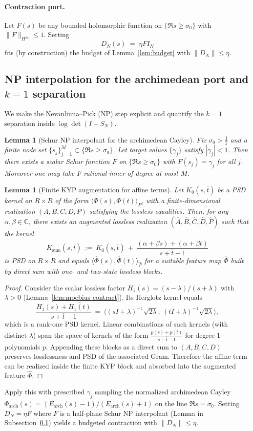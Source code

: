\documentclass[11pt]{article}
\newtheorem{lemma}[theorem]{Lemma}
\theoremstyle{definition}
\theoremstyle{remark}
\newcommand{\C}{\mathbb{C}}
\begin{document}
\paragraph{Contraction port.}
Let $F(s)$ be any bounded holomorphic function on $\{\Re s\ge \sigma_0\}$ with $\|F\|_{H^\infty}\le 1$. Setting
\[
 D_N(s)\;=\;\eta F I_N
\]
fits (by construction) the budget of Lemma~\ref{lem:budget} with $\|D_N\|\le \eta$.
\subsection{NP interpolation for the archimedean port and $k=1$ separation}\label{subsec:NP-arch}
We make the Nevanlinna--Pick (NP) step explicit and quantify the $k=1$ separation inside $\log\det(I-S_N)$.
\begin{lemma}[Schur NP interpolant for the archimedean Cayley]
Fix $\sigma_0>\tfrac12$ and a finite node set $\{s_j\}_{j=1}^{M}\subset\{\Re s\ge \sigma_0\}$. Let target values $\{\gamma_j\}$ satisfy $|\gamma_j|<1$. Then there exists a scalar Schur function $F$ on $\{\Re s\ge \sigma_0\}$ with $F(s_j)=\gamma_j$ for all $j$. Moreover one may take $F$ rational inner of degree at most $M$.
\end{lemma}
\begin{lemma}[Finite KYP augmentation for affine terms]\label{lem:affine-gram}
Let \(K_0(s,\overline t)\) be a PSD kernel on \(R\times R\) of the form \(\langle \Phi(s),\Phi(t)\rangle_{P}\), with a finite-dimensional realization \((A,B,C,D,P)\) satisfying the lossless equalities. Then, for any \(\alpha,\beta\in\C\), there exists an augmented lossless realization \((\widehat A,\widehat B,\widehat C,\widehat D,\widehat P)\) such that the kernel
\[
 K_\mathrm{sum}(s,\overline t)\ :=\ K_0(s,\overline t)\ +\ \frac{(\alpha+\beta s)+\overline{(\alpha+\beta t)}}{s+\overline t -1}
\]
is PSD on \(R\times R\) and equals \(\langle \widehat\Phi(s),\widehat\Phi(t)\rangle_{\widehat P}\) for a suitable feature map \(\widehat\Phi\) built by direct sum with one- and two-state lossless blocks.
\end{lemma}
\begin{proof}
Consider the scalar lossless factor \(H_1(s)=(s-\lambda)/(s+\lambda)\) with \(\lambda>0\) (Lemma~\ref{lem:moebius-contract}). Its Herglotz kernel equals
\[\frac{H_1(s)+\overline{H_1(t)}}{s+\overline t -1}\ =\ \Big\langle (sI+\lambda)^{-1}\sqrt{2\lambda},\ (tI+\lambda)^{-1}\sqrt{2\lambda}\Big\rangle,\]
which is a rank-one PSD kernel. Linear combinations of such kernels (with distinct \(\lambda\)) span the space of kernels of the form \(\frac{p(s)+\overline{p(t)}}{s+\overline t-1}\) for degree-1 polynomials \(p\). Appending these blocks as a direct sum to \((A,B,C,D)\) preserves losslessness and PSD of the associated Gram. Therefore the affine term can be realized inside the finite KYP block and absorbed into the augmented feature \(\widehat\Phi\).
\end{proof}
Apply this with prescribed $\gamma_j$ sampling the normalized archimedean Cayley $\Phi_{\mathrm{arch}}(s)=(E_{\mathrm{arch}}(s)-1)/(E_{\mathrm{arch}}(s)+1)$ on the line $\Re s=\sigma_0$. Setting $D_N=\eta F$ where $F$ is a half-plane Schur NP interpolant (Lemma in Subsection~\ref{subsec:NP-arch}) yields a budgeted contraction with $\|D_N\|\le \eta$.
\end{document}
